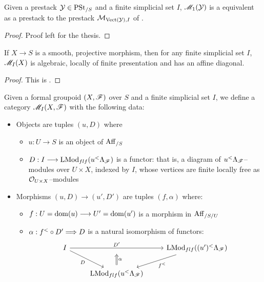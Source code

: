 \documentclass[11pt]{amsart}
\begin{document}
\begin{thm}\label{thm:mod-quiv-bun-simple}
Given a prestack $\mathcal{Y} \in \mathrm{PSt}_{/S}$ and a finite simplicial set $I$,
$\mathscr{M}_1(\mathcal{Y})$ is a equivalent as a prestack to the prestack
$\mathcal{M}_{\mathrm{Vect}(\mathcal{Y}), I}$ of \cite[Definition 4.4]{ModQuivBun}.
\end{thm}
\begin{proof}
Proof left for the thesis.
\end{proof}

\begin{thm}
If $X \to S$ is a smooth, projective morphism, then for any finite simplicial
set $I$, $\mathscr{M}_I(X)$ is algebraic, locally of finite presentation and has an
affine diagonal.
\end{thm}
\begin{proof}
This is \cite[Theorem 4.11]{ModQuivBun}.
\end{proof}

\begin{cns}
Given a formal groupoid $(X, \mathscr{F})$ over $S$ and a finite simplicial set $I$,
we define a category $\mathscr{M}_I(X, \mathscr{F})$ with the following data:
\begin{itemize}
\item Objects are tuples $(u, D)$ where
  \begin{itemize}
  \item $u : U \to S$ is an object of $\mathrm{Aff}_{/S}$
  \item $D : I \to \LMod_{flf}(u^<\Lambda_\sF)$ is a functor: that is, a
    diagram of $u^<\Lambda_\mathscr{F}$--modules over $U \times X$, indexed by $I$,
    whose vertices are finite locally free as $\mathcal{O}_{U \times X}$--modules
  \end{itemize}
\item Morphisms $(u, D) \to (u', D')$ are tuples $(f, \alpha)$ where:
  \begin{itemize}
  \item $f : U = \dom(u) \to U' = \dom(u')$ is a morphism in $\mathrm{Aff}_{/S/U}$
  \item $\alpha : f^< \circ D' \To D$ is a natural isomorphism of functors:
  \[\begin{tikzcd}
  I \ar[rr, "D'", ""{below, name=U}] \ar[rd, "D" below left] & &
  \LMod_{flf}((u')^<\Lambda_\sF) \ar[ld, "f^<" below right] \\ &
  \LMod_{flf}(u^<\Lambda_\sF)
    \ar[from=U, Leftarrow, "\alpha", shorten=0.35em] &
  \end{tikzcd}\]
  \end{itemize}
\end{itemize}
\end{cns}
\end{document}
